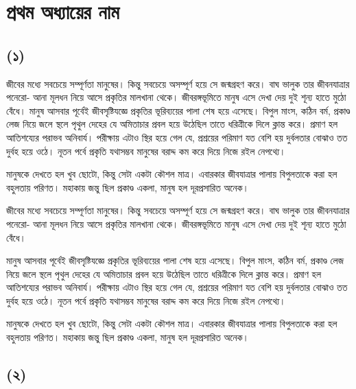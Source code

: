 \chapter*{প্রথম অধ্যায়ের নাম}

\section*{(১)}

জীবের মধ্যে সবচেয়ে সম্পূর্ণতা মানুষের। কিন্তু সবচেয়ে অসম্পূর্ণ হয়ে সে জন্মগ্রহণ করে। বাঘ ভালুক তার জীবনযাত্রার পনেরো- আনা মূলধন নিয়ে আসে প্রকৃতির মালখানা থেকে। জীবরঙ্গভূমিতে মানুষ এসে দেখা দেয় দুই শূন্য হাতে মুঠো বেঁধে।
মানুষ আসবার পূর্বেই জীবসৃষ্টিযজ্ঞে প্রকৃতির ভূরিব্যয়ের পালা শেষ হয়ে এসেছে। বিপুল মাংস, কঠিন বর্ম, প্রকাণ্ড লেজ নিয়ে জলে স্থলে পৃথুল দেহের যে অমিতাচার প্রবল হয়ে উঠেছিল তাতে ধরিত্রীকে দিলে ক্লান্ত করে। প্রমাণ হল আতিশয্যের পরাভব অনিবার্য। পরীক্ষায় এটাও স্থির হয়ে গেল যে, প্রশ্রয়ের পরিমাণ যত বেশি হয় দুর্বলতার বোঝাও তত দুর্বহ হয়ে ওঠে। নূতন পর্বে প্রকৃতি যথাসম্ভব মানুষের বরাদ্দ কম করে দিয়ে নিজে রইল নেপথ্যে।

মানুষকে দেখতে হল খুব ছোটো, কিন্তু সেটা একটা কৌশল মাত্র। এবারকার জীবযাত্রার পালায় বিপুলতাকে করা হল বহুলতায় পরিণত। মহাকায় জন্তু ছিল প্রকাণ্ড একলা, মানুষ হল দূরপ্রসারিত অনেক।

জীবের মধ্যে সবচেয়ে সম্পূর্ণতা মানুষের। কিন্তু সবচেয়ে অসম্পূর্ণ হয়ে সে জন্মগ্রহণ করে। বাঘ ভালুক তার জীবনযাত্রার পনেরো- আনা মূলধন নিয়ে আসে প্রকৃতির মালখানা থেকে। জীবরঙ্গভূমিতে মানুষ এসে দেখা দেয় দুই শূন্য হাতে মুঠো বেঁধে।

মানুষ আসবার পূর্বেই জীবসৃষ্টিযজ্ঞে প্রকৃতির ভূরিব্যয়ের পালা শেষ হয়ে এসেছে। বিপুল মাংস, কঠিন বর্ম, প্রকাণ্ড লেজ নিয়ে জলে স্থলে পৃথুল দেহের যে অমিতাচার প্রবল হয়ে উঠেছিল তাতে ধরিত্রীকে দিলে ক্লান্ত করে। প্রমাণ হল আতিশয্যের পরাভব অনিবার্য। পরীক্ষায় এটাও স্থির হয়ে গেল যে, প্রশ্রয়ের পরিমাণ যত বেশি হয় দুর্বলতার বোঝাও তত দুর্বহ হয়ে ওঠে। নূতন পর্বে প্রকৃতি যথাসম্ভব মানুষের বরাদ্দ কম করে দিয়ে নিজে রইল নেপথ্যে।

মানুষকে দেখতে হল খুব ছোটো, কিন্তু সেটা একটা কৌশল মাত্র। এবারকার জীবযাত্রার পালায় বিপুলতাকে করা হল বহুলতায় পরিণত। মহাকায় জন্তু ছিল প্রকাণ্ড একলা, মানুষ হল দূরপ্রসারিত অনেক।

\section*{(২)}

